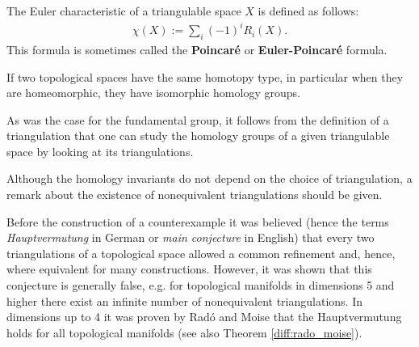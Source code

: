     \begin{definition}\label{topology:euler_characteristic}
        The Euler characteristic of a triangulable space $X$ is defined as follows:
        \begin{gather}
            \chi(X) := \sum_i(-1)^iR_i(X).
        \end{gather}
        This formula is sometimes called the \textbf{Poincar\'e} or \textbf{Euler-Poincar\'e} formula.
    \end{definition}

    \begin{property}[Isomorphisms]
        If two topological spaces have the same homotopy type, in particular when they are homeomorphic, they have isomorphic homology groups.
    \end{property}
    \begin{result}
        As was the case for the fundamental group, it follows from the definition of a triangulation that one can study the homology groups of a given triangulable space by looking at its triangulations.
    \end{result}

    Although the homology invariants do not depend on the choice of triangulation, a remark about the existence of nonequivalent triangulations should be given.
    \begin{remark}
        Before the construction of a counterexample it was believed (hence the terms \textit{Hauptvermutung} in German or \textit{main conjecture} in English) that every two triangulations of a topological space allowed a common refinement and, hence, where equivalent for many constructions. However, it was shown that this conjecture is generally false, e.g. for topological manifolds in dimensions 5 and higher there exist an infinite number of nonequivalent triangulations. In dimensions up to 4 it was proven by Rad\'o and Moise that the Hauptvermutung holds for all topological manifolds (see also Theorem \ref{diff:rado_moise}).
    \end{remark}

